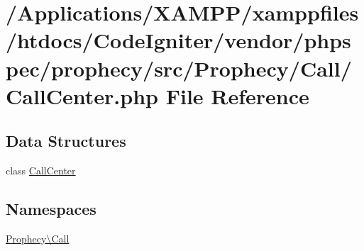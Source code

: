 \hypertarget{_call_center_8php}{}\section{/\+Applications/\+X\+A\+M\+P\+P/xamppfiles/htdocs/\+Code\+Igniter/vendor/phpspec/prophecy/src/\+Prophecy/\+Call/\+Call\+Center.php File Reference}
\label{_call_center_8php}
\subsection*{Data Structures}
\begin{DoxyCompactItemize}
\item 
class \mbox{\hyperlink{class_prophecy_1_1_call_1_1_call_center}{Call\+Center}}
\end{DoxyCompactItemize}
\subsection*{Namespaces}
\begin{DoxyCompactItemize}
\item 
 \mbox{\hyperlink{namespace_prophecy_1_1_call}{Prophecy\textbackslash{}\+Call}}
\end{DoxyCompactItemize}
